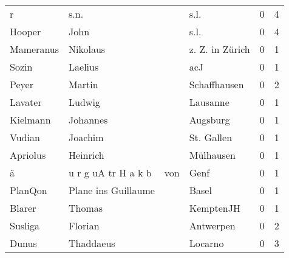 \begin{center}
\begin{tiny}
\begin{longtabu}{llllrr}
                        r &                               s.n. &             &                                        s.l. &          0 &         4 \\
                   Hooper &                               John &             &                                        s.l. &          0 &         4 \\
                Mameranus &                           Nikolaus &             &                             z. Z. in Zürich &          0 &         1 \\
                    Sozin &                            Laelius &             &                                         acJ &          0 &         1 \\
                    Peyer &                             Martin &             &                                Schaffhausen &          0 &         2 \\
                  Lavater &                             Ludwig &             &                                    Lausanne &          0 &         1 \\
                 Kielmann &                           Johannes &             &                                    Augsburg &          0 &         1 \\
                   Vudian &                            Joachim &             &                                  St. Gallen &          0 &         1 \\
                 Apriolus &                           Heinrich &             &                                   Mülhausen &          0 &         1 \\
                        ä &                u r g uA tr H a k b &         von &                                        Genf &          0 &         1 \\
                  PlanQon &                Plane ins Guillaume &             &                                       Basel &          0 &         1 \\
                   Blarer &                             Thomas &             &                                   KemptenJH &          0 &         1 \\
                  Susliga &                            Florian &             &                                   Antwerpen &          0 &         2 \\
                    Dunus &                          Thaddaeus &             &                                     Locarno &          0 &         3 \\

\end{longtabu}
\end{tiny}
\end{center}
